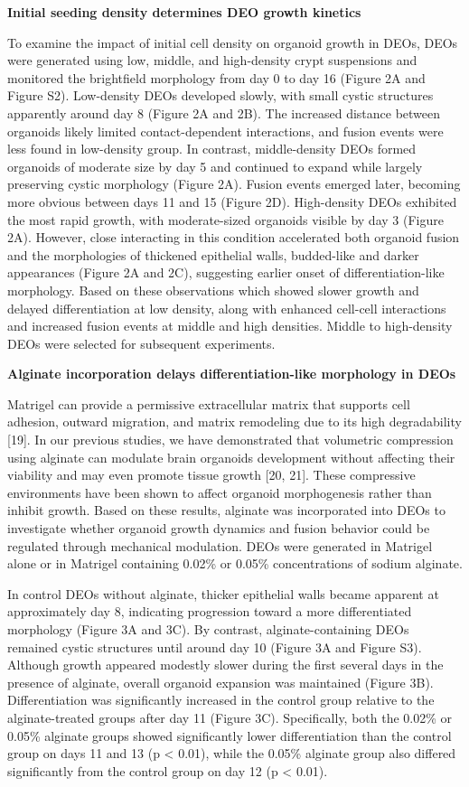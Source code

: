 \documentclass[
]{article}
\begin{document}
\textbf{Initial seeding density determines DEO growth kinetics}

To examine the impact of initial cell density on organoid growth in DEOs, DEOs were generated using low, middle, and high-density crypt suspensions and monitored the brightfield morphology from day 0 to day 16 (Figure 2A and Figure S2). Low-density DEOs developed slowly, with small cystic structures apparently around day 8 (Figure 2A and 2B). The increased distance between organoids likely limited contact-dependent interactions, and fusion events were less found in low-density group. In contrast, middle-density DEOs formed organoids of moderate size by day 5 and continued to expand while largely preserving cystic morphology (Figure 2A). Fusion events emerged later, becoming more obvious between days 11 and 15 (Figure 2D). High-density DEOs exhibited the most rapid growth, with moderate-sized organoids visible by day 3 (Figure 2A). However, close interacting in this condition accelerated both organoid fusion and the morphologies of thickened epithelial walls, budded-like and darker appearances (Figure 2A and 2C), suggesting earlier onset of differentiation-like morphology. Based on these observations which showed slower growth and delayed differentiation at low density, along with enhanced cell-cell interactions and increased fusion events at middle and high densities. Middle to high-density DEOs were selected for subsequent experiments.

\textbf{Alginate incorporation delays differentiation-like morphology in DEOs}

Matrigel can provide a permissive extracellular matrix that supports cell adhesion, outward migration, and matrix remodeling due to its high degradability {[}19{]}. In our previous studies, we have demonstrated that volumetric compression using alginate can modulate brain organoids development without affecting their viability and may even promote tissue growth {[}20, 21{]}. These compressive environments have been shown to affect organoid morphogenesis rather than inhibit growth. Based on these results, alginate was incorporated into DEOs to investigate whether organoid growth dynamics and fusion behavior could be regulated through mechanical modulation. DEOs were generated in Matrigel alone or in Matrigel containing 0.02\% or 0.05\% concentrations of sodium alginate.

In control DEOs without alginate, thicker epithelial walls became apparent at approximately day 8, indicating progression toward a more differentiated morphology (Figure 3A and 3C). By contrast, alginate-containing DEOs remained cystic structures until around day 10 (Figure 3A and Figure S3). Although growth appeared modestly slower during the first several days in the presence of alginate, overall organoid expansion was maintained (Figure 3B). Differentiation was significantly increased in the control group relative to the alginate-treated groups after day 11 (Figure 3C). Specifically, both the 0.02\% or 0.05\% alginate groups showed significantly lower differentiation than the control group on days 11 and 13 (p \textless{} 0.01), while the 0.05\% alginate group also differed significantly from the control group on day 12 (p \textless{} 0.01).
\end{document}
